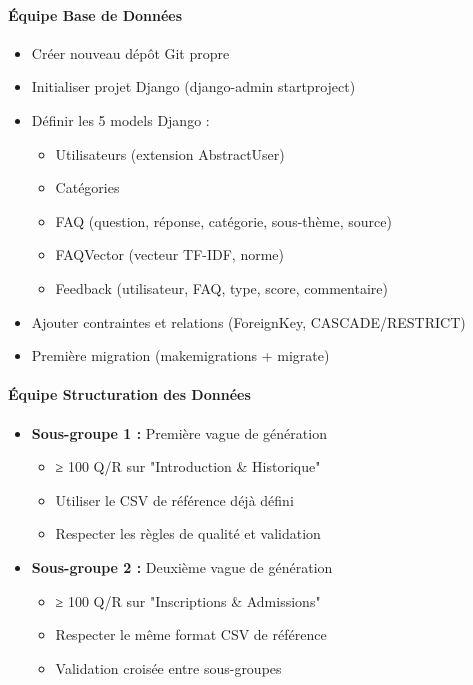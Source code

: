 \documentclass[11pt,a4paper]{article}
\begin{document}
\paragraph{Équipe Base de Données}
\begin{itemize}
    \item[$\square$] Créer nouveau dépôt Git propre
    \item[$\square$] Initialiser projet Django (django-admin startproject)
    \item[$\square$] Définir les 5 models Django :
    \begin{itemize}
        \item Utilisateurs (extension AbstractUser)
        \item Catégories
        \item FAQ (question, réponse, catégorie, sous-thème, source)
        \item FAQVector (vecteur TF-IDF, norme)
        \item Feedback (utilisateur, FAQ, type, score, commentaire)
    \end{itemize}
    \item[$\square$] Ajouter contraintes et relations (ForeignKey, CASCADE/RESTRICT)
    \item[$\square$] Première migration (makemigrations + migrate)
\end{itemize}

\paragraph{Équipe Structuration des Données}
\begin{itemize}
    \item[$\square$] \textbf{Sous-groupe 1 :} Première vague de génération
    \begin{itemize}
        \item ≥ 100 Q/R sur "Introduction \& Historique"
        \item Utiliser le CSV de référence déjà défini
        \item Respecter les règles de qualité et validation
    \end{itemize}

    \item[$\square$] \textbf{Sous-groupe 2 :} Deuxième vague de génération
    \begin{itemize}
        \item ≥ 100 Q/R sur "Inscriptions \& Admissions"
        \item Respecter le même format CSV de référence
        \item Validation croisée entre sous-groupes
    \end{itemize}
\end{itemize}
\end{document}
